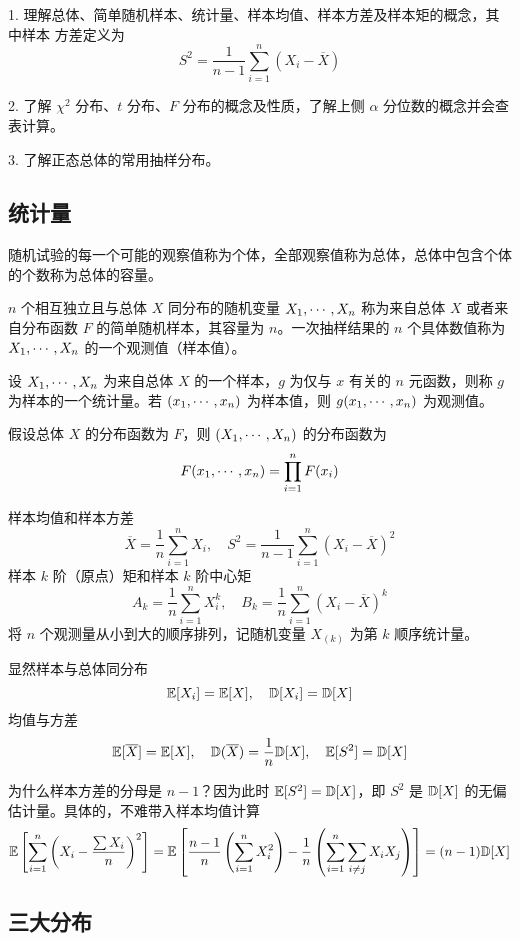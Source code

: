 1. 理解总体、简单随机样本、统计量、样本均值、样本方差及样本矩的概念，其中样本
方差定义为
\[ S^2 = \frac{1}{n-1} \sum_{i=1}^n (X_i - \overline{X}) \]

2. 了解 $\chi^2$ 分布、$t$ 分布、$F$ 分布的概念及性质，了解上侧 $\alpha$ 分位数的概念并会查表计算。

3. 了解正态总体的常用抽样分布。

\subsection{统计量}

随机试验的每一个可能的观察值称为个体，全部观察值称为总体，总体中包含个体的个数称为总体的容量。

$n$ 个相互独立且与总体 $X$ 同分布的随机变量 $X_1,\cdots,X_n$ 称为来自总体 $X$ 或者来自分布函数 $F$ 的简单随机样本，其容量为 $n$。一次抽样结果的 $n$ 个具体数值称为 $X_1,\cdots,X_n$ 的一个观测值（样本值）。

设 $X_1,\cdots,X_n$ 为来自总体 $X$ 的一个样本，$g$ 为仅与 $x$ 有关的 $n$ 元函数，则称 $g$ 为样本的一个统计量。若 $(x_1,\cdots,x_n)$ 为样本值，则 $g(x_1,\cdots,x_n)$ 为观测值。

假设总体 $X$ 的分布函数为 $F$，则 $(X_1,\cdots,X_n)$ 的分布函数为
\[ F(x_1,\cdots,x_n) = \prod_{i=1}^n F(x_i) \]

样本均值和样本方差
\[ \overline{X} = \frac{1}{n} \sum_{i=1}^n X_i, \quad S^2 = \frac{1}{n-1} \sum_{i=1}^n (X_i - \overline{X})^2 \]
样本 $k$ 阶（原点）矩和样本 $k$ 阶中心矩
\[ A_k = \frac{1}{n} \sum_{i=1}^n X_i^k, \quad B_k = \frac{1}{n} \sum_{i=1}^n (X_i - \overline{X})^k \]
将 $n$ 个观测量从小到大的顺序排列，记随机变量 $X_{(k)}$ 为第 $k$ 顺序统计量。

显然样本与总体同分布
\[ \mathbb{E}[X_i] = \mathbb{E} [X], \quad \mathbb{D}[X_i] = \mathbb{D}[X] \]
均值与方差
\[ \mathbb{E}[\overline{X}] = \mathbb{E} [X], \quad \mathbb{D}(\overline{X}) = \frac{1}{n} \mathbb{D} [X], \quad \mathbb{E}[S^2] = \mathbb{D} [X]  \]

\begin{note}
	为什么样本方差的分母是 $n-1$？因为此时 $\mathbb{E}[S^2] = \mathbb{D} [X]$，即 $S^2$ 是 $\mathbb{D}[X]$ 的无偏估计量。具体的，不难带入样本均值计算
	\[ \mathbb{E}\left[\sum_{i=1}^n \left(X_i - \frac{\sum X_i}{n}\right)^2\right]
		= \mathbb{E}\left[  \frac{n-1}{n} \left(\sum_{i=1}^n X_i^2\right) - \frac{1}{n}
			\left(\sum_{i=1}^{n} \sum_{i \neq j} X_iX_j\right) \right]
		= (n-1) \mathbb{D}[X] \]
\end{note}

\subsection{三大分布}

